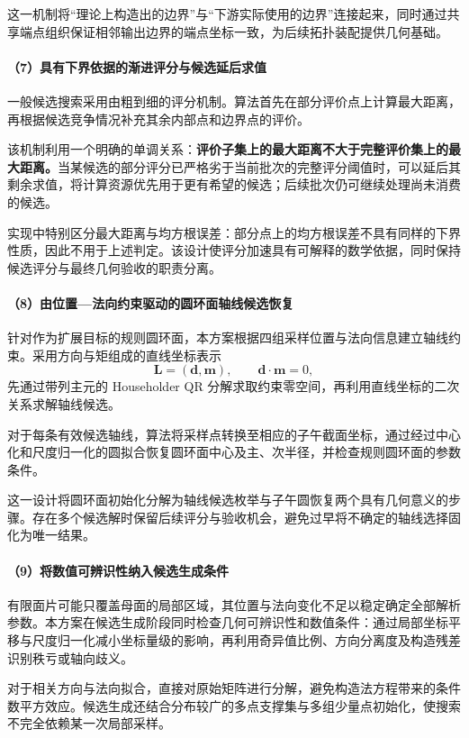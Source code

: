 这一机制将“理论上构造出的边界”与“下游实际使用的边界”连接起来，同时通过共享端点组织保证相邻输出边界的端点坐标一致，为后续拓扑装配提供几何基础。

\paragraph{（7）具有下界依据的渐进评分与候选延后求值}
一般候选搜索采用由粗到细的评分机制。算法首先在部分评价点上计算最大距离，再根据候选竞争情况补充其余内部点和边界点的评价。

该机制利用一个明确的单调关系：\textbf{评价子集上的最大距离不大于完整评价集上的最大距离。}当某候选的部分评分已严格劣于当前批次的完整评分阈值时，可以延后其剩余求值，将计算资源优先用于更有希望的候选；后续批次仍可继续处理尚未消费的候选。

实现中特别区分最大距离与均方根误差：部分点上的均方根误差不具有同样的下界性质，因此不用于上述判定。该设计使评分加速具有可解释的数学依据，同时保持候选评分与最终几何验收的职责分离。

\paragraph{（8）由位置—法向约束驱动的圆环面轴线候选恢复}
针对作为扩展目标的规则圆环面，本方案根据四组采样位置与法向信息建立轴线约束。采用方向与矩组成的直线坐标表示
\[\mathbf L=(\mathbf d,\mathbf m),\qquad\mathbf d\cdot\mathbf m=0,\]
先通过带列主元的 Householder QR 分解求取约束零空间，再利用直线坐标的二次关系求解轴线候选。

对于每条有效候选轴线，算法将采样点转换至相应的子午截面坐标，通过经过中心化和尺度归一化的圆拟合恢复圆环面中心及主、次半径，并检查规则圆环面的参数条件。

这一设计将圆环面初始化分解为轴线候选枚举与子午圆恢复两个具有几何意义的步骤。存在多个候选解时保留后续评分与验收机会，避免过早将不确定的轴线选择固化为唯一结果。

\paragraph{（9）将数值可辨识性纳入候选生成条件}
有限面片可能只覆盖母面的局部区域，其位置与法向变化不足以稳定确定全部解析参数。本方案在候选生成阶段同时检查几何可辨识性和数值条件：通过局部坐标平移与尺度归一化减小坐标量级的影响，再利用奇异值比例、方向分离度及构造残差识别秩亏或轴向歧义。

对于相关方向与法向拟合，直接对原始矩阵进行分解，避免构造法方程带来的条件数平方效应。候选生成还结合分布较广的多点支撑集与多组少量点初始化，使搜索不完全依赖某一次局部采样。


